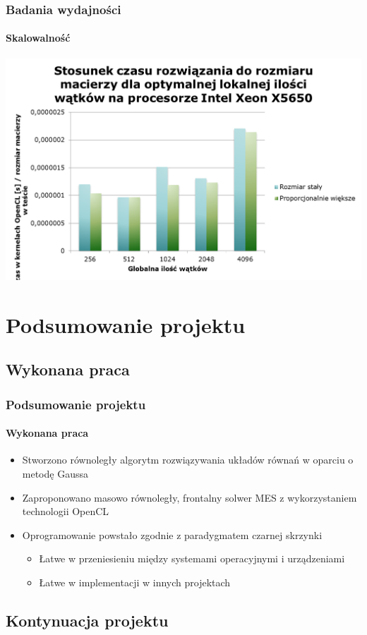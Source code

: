 \documentclass[12pt,handout]{beamer}
\begin{document}
\begin{frame}
\frametitle{Badania wydajności}
\framesubtitle{Skalowalność}
\hfill\includegraphics[scale=0.45]{czas6.png}\hspace*{\fill}
\end{frame}

\section{Podsumowanie projektu}
\subsection{Wykonana praca}

\begin{frame}
\frametitle{Podsumowanie projektu}
\framesubtitle{Wykonana praca}
\begin{itemize}

\item Stworzono równoległy algorytm rozwiązywania układów równań w oparciu o metodę Gaussa
\item Zaproponowano masowo równoległy, frontalny solwer MES z wykorzystaniem technologii OpenCL
\item Oprogramowanie powstało zgodnie z paradygmatem czarnej skrzynki
	\begin{itemize}
	\item Łatwe w przeniesieniu między systemami operacyjnymi i urządzeniami
	\item Łatwe w implementacji w innych projektach
	\end{itemize}
\end{itemize}
\end{frame}

\subsection{Kontynuacja projektu}
\end{document}
